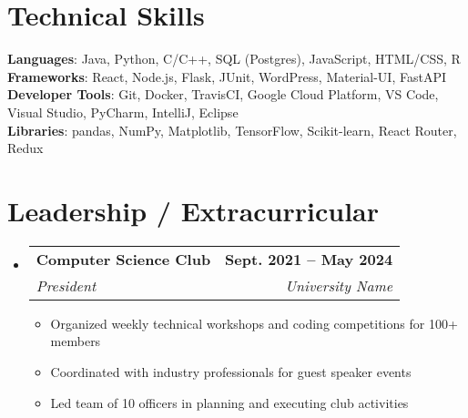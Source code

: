 \documentclass[letterpaper,11pt]{article}
\makeatletter
\newcommand{\resumeItem}[1]{
  \item\small{
    {#1 \vspace{-2pt}}
  }
}
\newcommand{\resumeSubheading}[4]{
  \vspace{-2pt}\item
    \begin{tabular*}{1.0\textwidth}[t]{l@{\extracolsep{\fill}}r}
      \textbf{#1} & \textbf{\small #2} \\
      \textit{\small#3} & \textit{\small #4} \\
    \end{tabular*}\vspace{-7pt}
}
\newcommand{\resumeSubHeadingListStart}{\begin{itemize}[leftmargin=0.0in, label={}]}
\newcommand{\resumeSubHeadingListEnd}{\end{itemize}}
\newcommand{\resumeItemListStart}{\begin{itemize}}
\newcommand{\resumeItemListEnd}{\end{itemize}\vspace{-5pt}}
\makeatother
\begin{document}
\section{Technical Skills}
 \begin{itemize}[leftmargin=0.15in, label={}]
    \small{\item{
     \textbf{Languages}{: Java, Python, C/C++, SQL (Postgres), JavaScript, HTML/CSS, R} \\
     \textbf{Frameworks}{: React, Node.js, Flask, JUnit, WordPress, Material-UI, FastAPI} \\
     \textbf{Developer Tools}{: Git, Docker, TravisCI, Google Cloud Platform, VS Code, Visual Studio, PyCharm, IntelliJ, Eclipse} \\
     \textbf{Libraries}{: pandas, NumPy, Matplotlib, TensorFlow, Scikit-learn, React Router, Redux}
    }}
 \end{itemize}
 \vspace{-16pt}

\section{Leadership / Extracurricular}
    \resumeSubHeadingListStart
        \resumeSubheading{Computer Science Club}{Sept. 2021 -- May 2024}{President}{University Name}
            \resumeItemListStart
                \resumeItem{Organized weekly technical workshops and coding competitions for 100+ members}
                \resumeItem{Coordinated with industry professionals for guest speaker events}
                \resumeItem{Led team of 10 officers in planning and executing club activities}
            \resumeItemListEnd
        
    \resumeSubHeadingListEnd
\end{document}

